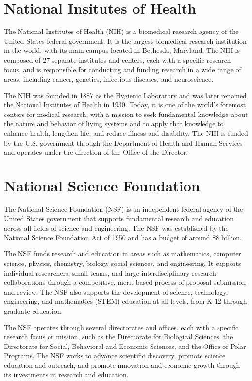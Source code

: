 \documentclass[
]{book}
\begin{document}
\hypertarget{nih}{%
\section{National Insitutes of Health}\label{nih}}

The National Institutes of Health (NIH) is a biomedical research agency of the United States federal government. It is the largest biomedical research institution in the world, with its main campus located in Bethesda, Maryland. The NIH is composed of 27 separate institutes and centers, each with a specific research focus, and is responsible for conducting and funding research in a wide range of areas, including cancer, genetics, infectious diseases, and neuroscience.

The NIH was founded in 1887 as the Hygienic Laboratory and was later renamed the National Institutes of Health in 1930. Today, it is one of the world's foremost centers for medical research, with a mission to seek fundamental knowledge about the nature and behavior of living systems and to apply that knowledge to enhance health, lengthen life, and reduce illness and disability. The NIH is funded by the U.S. government through the Department of Health and Human Services and operates under the direction of the Office of the Director.

\hypertarget{nsf}{%
\section{National Science Foundation}\label{nsf}}

The National Science Foundation (NSF) is an independent federal agency of the United States government that supports fundamental research and education across all fields of science and engineering. The NSF was established by the National Science Foundation Act of 1950 and has a budget of around \$8 billion.

The NSF funds research and education in areas such as mathematics, computer science, physics, chemistry, biology, social sciences, and engineering. It supports individual researchers, small teams, and large interdisciplinary research collaborations through a competitive, merit-based process of proposal submission and review. The NSF also supports the development of science, technology, engineering, and mathematics (STEM) education at all levels, from K-12 through graduate education.

The NSF operates through several directorates and offices, each with a specific research focus or mission, such as the Directorate for Biological Sciences, the Directorate for Social, Behavioral and Economic Sciences, and the Office of Polar Programs. The NSF works to advance scientific discovery, promote science education and outreach, and promote innovation and economic growth through its investments in research and education.
\end{document}
